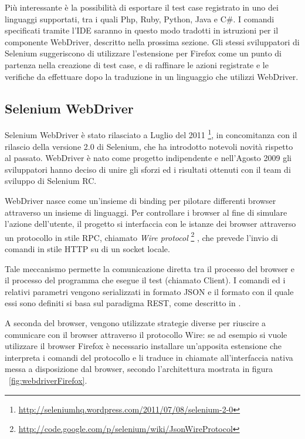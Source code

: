 Più interessante è la possibilità di esportare il test case registrato in uno dei linguaggi supportati, tra i quali Php, Ruby, Python, Java e C\#. I comandi specificati tramite l'IDE saranno in questo modo tradotti in istruzioni per il componente WebDriver, descritto nella prossima sezione. Gli stessi sviluppatori di Selenium suggeriscono di utilizzare l'estensione per Firefox come un punto di partenza nella creazione di test case, e di raffinare le azioni registrate e le verifiche da effettuare dopo la traduzione in un linguaggio che utilizzi WebDriver.

\subsection{Selenium WebDriver}

Selenium WebDriver è stato rilasciato a Luglio del 2011 \footnote{\url{http://seleniumhq.wordpress.com/2011/07/08/selenium-2-0}}, in concomitanza con il rilascio della versione 2.0 di Selenium, che ha introdotto notevoli novità rispetto al passato.
WebDriver è nato come progetto indipendente e nell'Agosto 2009 gli sviluppatori hanno deciso di unire gli sforzi ed i risultati ottenuti con il team di sviluppo di Selenium RC.

WebDriver nasce come un'insieme di binding per pilotare differenti browser attraverso un insieme di linguaggi. Per controllare i browser al fine di simulare l'azione dell'utente, il progetto si interfaccia con le istanze dei browser attraverso un protocollo in stile RPC, chiamato \emph{Wire protocol} \footnote{\url{http://code.google.com/p/selenium/wiki/JsonWireProtocol}} , che prevede l'invio di comandi in stile HTTP su di un socket locale. 

Tale meccanismo permette la comunicazione diretta tra il processo del browser e il processo del programma che esegue il test (chiamato Client). I comandi ed i relativi parametri vengono serializzati in formato JSON e il formato con il quale essi sono definiti si basa sul paradigma REST, come descritto in \cite{architectureOfOpenSource}. 

A seconda del browser, vengono utilizzate strategie diverse per riuscire a comunicare con il browser attraverso il protocollo Wire: se ad esempio si vuole utilizzare il browser Firefox è necessario installare un'apposita estensione che interpreta i comandi del protocollo e li traduce in chiamate all'interfaccia nativa messa a disposizione dal browser, secondo l'architettura mostrata in figura ~\ref{fig:webdriverFirefox}.

